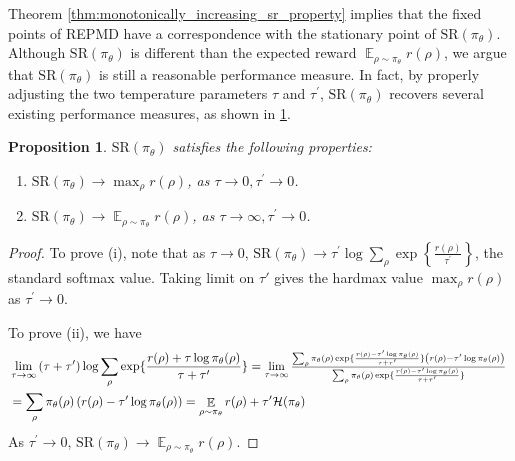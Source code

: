 \documentclass{article}
\DeclareMathOperator*\ep{\mathbb{E}}
\newcommand{\SR}{\text{SR}}
\newtheorem{prop}{Proposition}
\begin{document}
Theorem \ref{thm:monotonically_increasing_sr_property} implies that the fixed points of REPMD have a correspondence with the stationary point of $\text{SR}(\pi_\theta)$. 
Although $\text{SR}(\pi_\theta)$ is different than the expected reward $\ep_{\rho \sim \pi_\theta}{r(\rho)}$,  we argue that $\SR(\pi_\theta)$ is still a reasonable performance measure. In fact, by properly adjusting the two temperature parameters $\tau$ and $\tau^{\prime}$, $\SR(\pi_\theta)$ recovers several existing performance measures, as shown in \cref{prop:sr}.
\begin{prop}
	\label{prop:sr}
	$\SR(\pi_\theta)$ satisfies the following properties:
	\begin{enumerate}[label=(\roman*)]
		\item  $\SR(\pi_\theta) \to \max_{\rho}{r(\rho)}$, as $\tau \to 0, \tau^{\prime} \to 0$.
		\item $\SR(\pi_\theta) \to \ep_{\rho \sim \pi_\theta}{r(\rho)}$, as $\tau \to \infty, \tau^{\prime} \to 0$. 
	\end{enumerate}	
\end{prop}
\begin{proof}
	To prove (i), note that as $\tau \to 0$, $\SR(\pi_\theta) \to \tau^{\prime} \log{ \sum_{\rho}{ \exp\left\{ \frac{r(\rho) }{ \tau^{\prime} } \right\} }}$, the standard softmax value. Taking limit on $\tau'$ gives the hardmax value $\max_{\rho}{r(\rho)}$ as $\tau^{\prime} \to 0$.
	
	To prove (ii), we have 
\begin{align*}
&\lim\limits_{\tau \to \infty}{ (\tau + \tau^{\prime})\log{ \sum_{\rho}{ \exp\{ \frac{r(\rho) + \tau \log{\pi_\theta(\rho)} }{\tau + \tau^{\prime}} \} }} } = {\scalebox{.95} {$\lim\limits_{\tau \to \infty}{ \frac{ \sum_{\rho}{ \pi_\theta(\rho) \exp\{ \frac{r(\rho) - \tau^{\prime} \log{\pi_\theta(\rho)} }{\tau + \tau^{\prime}} \} \left( r(\rho) - \tau^{\prime}\log{\pi_\theta(\rho)} \right) } }{  \sum_{\rho}{ \pi_\theta(\rho) \exp\{ \frac{r(\rho) - \tau^{\prime} \log{\pi_\theta(\rho)} }{\tau + \tau^{\prime}} \} } } }$ } }\\
&= \sum_{\rho}{ \pi_\theta(\rho) \left( r(\rho) - \tau^{\prime}\log{\pi_\theta(\rho)} \right) } = \ep_{\rho \sim \pi_\theta}{r(\rho)} + \tau^{\prime} \mathcal{H}(\pi_\theta)
 \end{align*}
 	As $\tau^{\prime} \to 0$, $\SR(\pi_\theta) \to \ep_{\rho \sim \pi_\theta}{r(\rho)}$.
\end{proof}
\end{document}
